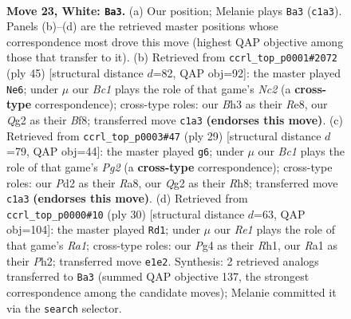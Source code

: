 \documentclass[11pt]{article}
\begin{document}
\clearpage

\begin{figure}[p]\centering
\begin{subfigure}{0.46\textwidth}\centering
\resizebox{\linewidth}{!}{%
\newchessgame
\chessboard[
  setfen={r3r1k1/bp1b1ppp/pq2p1n1/8/3p2P1/1P5B/P2P1PQP/RNB1RK2 w - - 2 23},
  showmover=false,
  pgfstyle=straightmove, color=movearrow, markmove={c1-a3}
]}
\caption{}
\end{subfigure}\hfill
\begin{subfigure}{0.46\textwidth}\centering
\resizebox{\linewidth}{!}{%
\newchessgame
\chessboard[
  setfen={4rbk1/p1nr1qpp/2p2p2/P1p1p3/8/2PPNQ2/1P3PPP/2BRR1K1 b - - 10 23},
  showmover=false,
  pgfstyle=straightmove, color=movearrow, markmove={c7-e6}
]}
\caption{}
\end{subfigure}
\\[4pt]
\begin{subfigure}{0.46\textwidth}\centering
\resizebox{\linewidth}{!}{%
\newchessgame
\chessboard[
  setfen={r3k2r/1b1qbppp/p7/1p1p4/2pP1B2/P1P1PB2/5PPP/R2Q1RK1 b kq - 0 15},
  showmover=false,
  pgfstyle=straightmove, color=movearrow, markmove={g7-g6}
]}
\caption{}
\end{subfigure}\hfill
\begin{subfigure}{0.46\textwidth}\centering
\resizebox{\linewidth}{!}{%
\newchessgame
\chessboard[
  setfen={r3k2r/1b1p1p2/ppnBpq1p/6p1/2P5/P7/1P2QPPP/R3KB1R w KQkq - 1 16},
  showmover=false,
  pgfstyle=straightmove, color=movearrow, markmove={a1-d1}
]}
\caption{}
\end{subfigure}
\caption{\textbf{Move 23, White: \texttt{Ba3}.} (a) Our position; Melanie plays \texttt{Ba3} (\texttt{c1a3}). Panels (b)--(d) are the retrieved master positions whose correspondence most drove this move (highest QAP objective among those that transfer to it). (b) Retrieved from \texttt{ccrl\_top\_p0001\#2072} (ply 45) [structural distance $d$=82, QAP obj=92]: the master played \texttt{Ne6}; under $\mu$ our \emph{Bc1} plays the role of that game's \emph{Nc2} (a \textbf{cross-type} correspondence); cross-type roles: our \emph{B}h3 as their \emph{R}e8, our \emph{Q}g2 as their \emph{B}f8; transferred move \texttt{c1a3} \textbf{(endorses this move)}. (c) Retrieved from \texttt{ccrl\_top\_p0003\#47} (ply 29) [structural distance $d$=79, QAP obj=44]: the master played \texttt{g6}; under $\mu$ our \emph{Bc1} plays the role of that game's \emph{Pg2} (a \textbf{cross-type} correspondence); cross-type roles: our \emph{P}d2 as their \emph{R}a8, our \emph{Q}g2 as their \emph{R}h8; transferred move \texttt{c1a3} \textbf{(endorses this move)}. (d) Retrieved from \texttt{ccrl\_top\_p0000\#10} (ply 30) [structural distance $d$=63, QAP obj=104]: the master played \texttt{Rd1}; under $\mu$ our \emph{Re1} plays the role of that game's \emph{Ra1}; cross-type roles: our \emph{P}g4 as their \emph{R}h1, our \emph{R}a1 as their \emph{P}h2; transferred move \texttt{e1e2}. Synthesis: 2 retrieved analogs transferred to \texttt{Ba3} (summed QAP objective 137, the strongest correspondence among the candidate moves); Melanie committed it via the \texttt{search} selector.}
\label{fig:thought-m44}
\end{figure}
\end{document}
